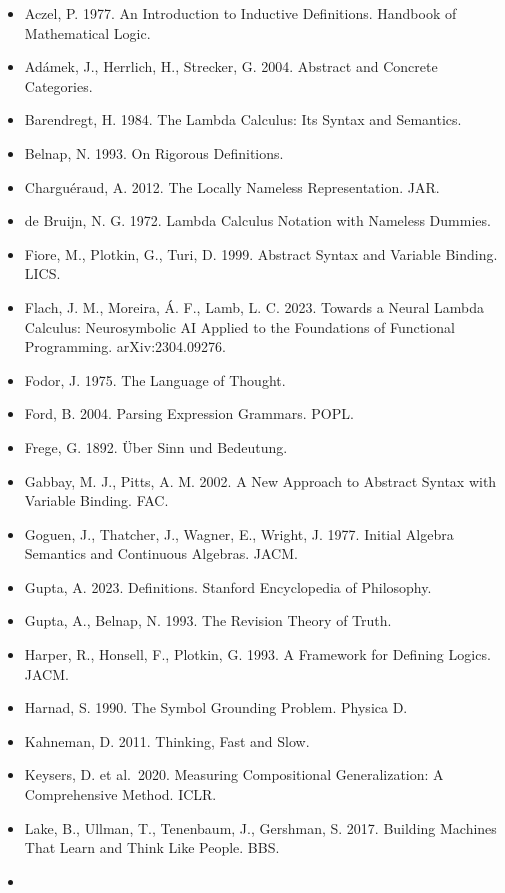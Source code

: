\documentclass[
]{article}
\providecommand{\tightlist}{%
  \setlength{\itemsep}{0pt}\setlength{\parskip}{0pt}}
\begin{document}
\begin{itemize}
\tightlist
\item
  Aczel, P. 1977. An Introduction to Inductive Definitions. Handbook of
  Mathematical Logic.
\item
  Adámek, J., Herrlich, H., Strecker, G. 2004. Abstract and Concrete
  Categories.
\item
  Barendregt, H. 1984. The Lambda Calculus: Its Syntax and Semantics.
\item
  Belnap, N. 1993. On Rigorous Definitions.
\item
  Charguéraud, A. 2012. The Locally Nameless Representation. JAR.
\item
  de Bruijn, N. G. 1972. Lambda Calculus Notation with Nameless Dummies.
\item
  Fiore, M., Plotkin, G., Turi, D. 1999. Abstract Syntax and Variable
  Binding. LICS.
\item
  Flach, J. M., Moreira, Á. F., Lamb, L. C. 2023. Towards a Neural
  Lambda Calculus: Neurosymbolic AI Applied to the Foundations of
  Functional Programming. arXiv:2304.09276.
\item
  Fodor, J. 1975. The Language of Thought.
\item
  Ford, B. 2004. Parsing Expression Grammars. POPL.
\item
  Frege, G. 1892. Über Sinn und Bedeutung.
\item
  Gabbay, M. J., Pitts, A. M. 2002. A New Approach to Abstract Syntax
  with Variable Binding. FAC.
\item
  Goguen, J., Thatcher, J., Wagner, E., Wright, J. 1977. Initial Algebra
  Semantics and Continuous Algebras. JACM.
\item
  Gupta, A. 2023. Definitions. Stanford Encyclopedia of Philosophy.
\item
  Gupta, A., Belnap, N. 1993. The Revision Theory of Truth.
\item
  Harper, R., Honsell, F., Plotkin, G. 1993. A Framework for Defining
  Logics. JACM.
\item
  Harnad, S. 1990. The Symbol Grounding Problem. Physica D.
\item
  Kahneman, D. 2011. Thinking, Fast and Slow.
\item
  Keysers, D. et al.~2020. Measuring Compositional Generalization: A
  Comprehensive Method. ICLR.
\item
  Lake, B., Ullman, T., Tenenbaum, J., Gershman, S. 2017. Building
  Machines That Learn and Think Like People. BBS.
\item

\end{itemize}
\end{document}
